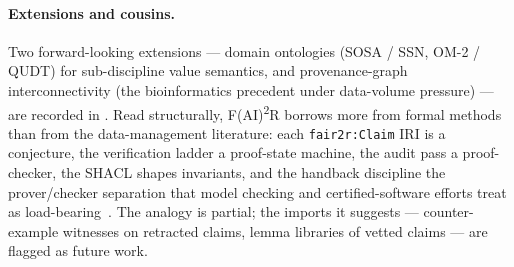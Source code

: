 \paragraph{Extensions and cousins.}
Two forward-looking extensions --- domain ontologies (SOSA / SSN,
OM-2 / QUDT) for sub-discipline value semantics, and
provenance-graph interconnectivity (the bioinformatics precedent
under data-volume pressure) --- are recorded in
. Read structurally,
F(AI)\textsuperscript{2}R borrows more from formal methods than
from the data-management literature: each \texttt{fair2r:Claim}
IRI is a conjecture, the verification ladder a proof-state
machine, the audit pass a proof-checker, the SHACL shapes
invariants, and the handback discipline the prover/checker
separation that model checking and certified-software efforts
treat as
load-bearing~\cite{clarke2009modelchecking,klein2009sel4}.
The analogy is partial; the imports it suggests --- counter-example
witnesses on retracted claims, lemma libraries of vetted claims ---
are flagged as future work.
